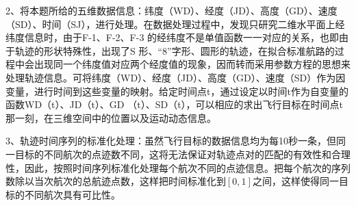 \documentclass[GBK]{ctexart}
\begin{document}
\begin{spacing}{1.5}
2、将本题所给的五维数据信息：纬度（WD）、经度（JD）、高度（GD）、速度（SD）、时间（SJ），进行处理。在数据处理过程中，发现只研究二维水平面上经纬度信息时，由于F-1、F-2、F-3 的经纬度不是单值函数一一对应的关系，也即由于轨迹的形状特殊性，出现了S 形、“8”字形、圆形的轨迹，在拟合标准航路的过程中会出现同一个纬度值对应两个经度值的现象，因而转而采用参数方程的思想来处理轨迹信息。可将纬度（WD）、经度（JD）、高度（GD）、速度（SD）作为因变量，进行时间到这些变量的映射。给定时间点t，通过设定以时间t作为自变量的函数WD（t）、JD（t）、GD （t）、SD（t），可以相应的求出飞行目标在时间点t 那一刻，在三维空间中的位置以及运动动态信息。

3、轨迹时间序列的标准化处理：虽然飞行目标的数据信息均为每10秒一条，但同一目标的不同航次的点迹数不同，这将无法保证对轨迹点对的匹配的有效性和合理性，因此，按照时间序列标准化处理每个航次不同的点迹信息。把每个航次的序列数除以当次航次的总航迹点数，这样把时间标准化到$\left[ {0,1} \right]$之间，这样使得同一目标的不同航次具有可比性。


\end{spacing}
\end{document}
